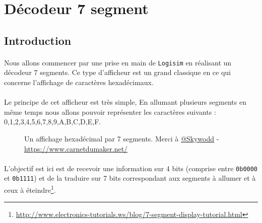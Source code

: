 \documentclass{article}
\begin{document}
    \section{Décodeur 7 segment}

    \subsection{Introduction}

    \paragraph{}
    Nous allons commencer par une prise en main de \texttt{Logisim} en réalisant un décodeur 7 segments.
    Ce type d'afficheur est un grand classique en ce qui concerne l'affichage de caractères hexadécimaux.

    \paragraph{}
    Le principe de cet afficheur est très simple, En allumant plusieurs segments en même temps nous allons pouvoir représenter les caractères suivants :
    0,1,2,3,4,5,6,7,8,9,A,B,C,D,E,F.

    \begin{figure}[H]
        \caption{Un affichage hexadécimal par 7 segments. Merci à \href{https://twitter.com/skywodd}{@Skywodd} - \url{https://www.carnetdumaker.net/}}
    \end{figure}

    \paragraph{}
    L'objectif est ici est de recevoir une information sur 4 bits (comprise entre \texttt{0b0000} et \texttt{0b1111}) et de la traduire sur 7 bits correspondant aux segments à allumer et à ceux à éteindre\footnote{\url{http://www.electronics-tutorials.ws/blog/7-segment-display-tutorial.html}}.
\end{document}
